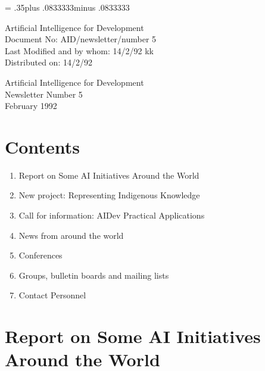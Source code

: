 \pagestyle{myheadings}
\setlength{\textheight}{9in}
\setlength{\topmargin}{0in}
\setlength{\headheight}{.3in}
\setlength{\headsep}{.5in}
\parindent=0pt
\parskip= .35\baselineskip plus .0833333\baselineskip minus .0833333\baselineskip

Artificial Intelligence for Development\\
Document No: AID/newsletter/number 5\\
Last Modified and by whom: 14/2/92 kk \\
Distributed on: 14/2/92\\
\LARGE
\begin{center} Artificial Intelligence for Development\\
Newsletter Number 5\\February 1992\\

\end{center}
\normalsize
\section*{Contents}
\begin{enumerate}
\item Report on Some AI Initiatives Around the World
\item New project: Representing Indigenous Knowledge
\item Call for information: AIDev Practical Applications
\item News from around the world
\item Conferences
\item Groups, bulletin boards and mailing lists
\item Contact Personnel
\end{enumerate} 

\section{Report on Some AI Initiatives Around the World}
